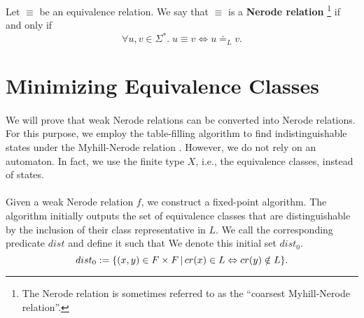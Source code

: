 \begin{definition}
    \label{Nerode_Rel}
    Let $\equiv$ be an equivalence relation. We say that $\equiv$ is a \textbf{Nerode relation}%
    \footnote{The Nerode relation is sometimes referred to as the ``coarsest Myhill-Nerode relation''.}
    if and only if
    \begin{equation*}
        \forall u, v \in \Sigma^*. \; u \equiv v \iff u \doteq_L v.
    \end{equation*}
\end{definition}












\section{Minimizing Equivalence Classes}

\paragraph{}
We will prove that weak Nerode relations can be converted into Nerode relations.
For this purpose, we employ the table-filling algorithm to find indistinguishable states under the Myhill-Nerode relation \cite{DBLP:books/daglib/0011126}.
However, we do not rely on an automaton. 
In fact, we use the finite type $X$, i.e., the equivalence classes, instead of states.

\paragraph{}
Given a weak Nerode relation $f$, we construct a fixed-point algorithm.
The algorithm initially outputs the set of equivalence classes that are distinguishable by the inclusion of their class representative in $L$. 
We call the corresponding predicate $\mathit{dist}$ and define it such that
We denote this initial set $\mathit{dist_0}$.
\begin{equation*}
    dist_0 := \{ (x,y)  \in F \times F \, | \, cr(x) \in L \Leftrightarrow cr(y) \notin L\}.
\end{equation*}


